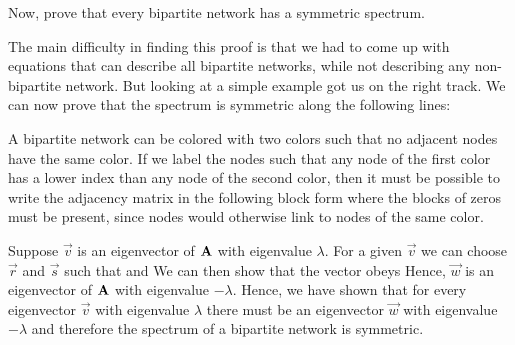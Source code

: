 \subquestion
Now, prove that every bipartite network has a symmetric spectrum. 

\solution 
The main difficulty in finding this proof is that we had to come up with equations that can describe all bipartite networks, while not describing any non-bipartite network. But looking at a simple example got us on the right track. We can now prove that the spectrum is symmetric along the following lines:

A bipartite network can be colored with two colors such that no adjacent nodes have the same color. If we label the nodes such that any node of the first color has a lower index than any node of the second color, then it must be possible to write the adjacency matrix in the following block form 
where the blocks of zeros must be present, since nodes would otherwise link to nodes of the same color. 

Suppose $\vec{v}$ is an eigenvector of $\bf A$ with eigenvalue $\lambda$. For a given $\vec{v}$ we can choose $\vec{r}$ and $\vec{s}$ such that 
and 
We can then show that the vector 
obeys
Hence, $\vec{w}$ is an eigenvector of ${\bf A}$ with eigenvalue $-\lambda$.
Hence, we have shown that for every eigenvector $\vec{v}$ with eigenvalue $\lambda$ there must be an eigenvector $\vec{w}$ with eigenvalue $-\lambda$ and therefore the spectrum of a bipartite network is symmetric. 